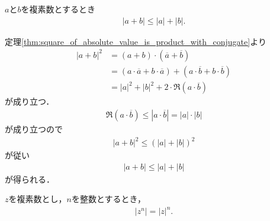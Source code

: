 	\begin{screen}
		\begin{thm}[劣加法性]\label{thm:sub_additivity_of_absolute_value}
			$a$と$b$を複素数とするとき
			\begin{align}
				|a + b| \leq |a| + |b|.
			\end{align}
		\end{thm}
	\end{screen}
	
	\begin{sketch}
		定理\ref{thm:square_of_absolute_value_is_product_with_conjugate}より
		\begin{align}
			|a + b|^2 &= (a + b) \cdot (\overline{a} + \overline{b}) \\
			&= (a \cdot \overline{a} + b \cdot \overline{a})
			+ (a \cdot \overline{b} + b \cdot \overline{b}) \\
			&= |a|^2 + |b|^2 + 2 \cdot \Re{(a \cdot \overline{b})}
		\end{align}
		が成り立つ．
		\begin{align}
			\Re{(a \cdot \overline{b})}
			\leq |a \cdot \overline{b}|
			= |a| \cdot |b|
		\end{align}
		が成り立つので
		\begin{align}
			|a + b|^2 \leq (|a| + |b|)^2
		\end{align}
		が従い
		\begin{align}
			|a + b| \leq |a| + |b|
		\end{align}
		が得られる．
		\QED
	\end{sketch}
	
	\begin{screen}
		\begin{thm}[整数乗の絶対値は絶対値の整数乗]
			$z$を複素数とし，$n$を整数とするとき，
			\begin{align}
				|z^{n}| = |z|^{n}.
			\end{align}
		\end{thm}
	\end{screen}
	
